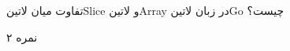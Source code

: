 \documentclass[../main.tex]{subfiles}
\begin{document}

تفاوت میان ‌لاتین{Slice} و ‌لاتین{Array} در زبان ‌لاتین{Go} چیست؟

۲ نمره
\end{document}
